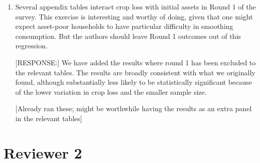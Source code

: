 \documentclass[letterpaper,12pt]{article}
\begin{document}
\begin{enumerate}
The table also supports our conjecture that the estimated effects 
[might need a less causal word] 
of crop loss capture a conscious decision. 
If shocks lead to lower probability of pregnancy and birth because
of other factors than the decision to use contraceptive we should see
a negative and statistically significant coefficient for the crop loss
dummy by itself.
We do not.
Instead, what we get is a substantial negative coefficient for the interaction
between contraceptive use and crop loss and a coefficient for crop loss 
on its own that is positive and far from statistically significant.


\item Several appendix tables interact crop loss with initial assets in
Round 1 of the survey. This exercise is interesting and worthy of doing,
given that one might expect asset-poor households to have particular
difficulty in smoothing consumption. But the authors should leave Round
1 outcomes out of this regression.

[RESPONSE:] We have added the results where round 1 has been excluded
to the relevant tables.
The results are broadly consistent with what we originally found, 
although substantially less likely to be statistically significant 
because of the lower variation in crop loss and the smaller sample
size.

[Already ran these; might be worthwhile having the results as an extra
panel in the relevant tables]


\end{enumerate}



\newpage

\section*{Reviewer 2}

\end{document}
